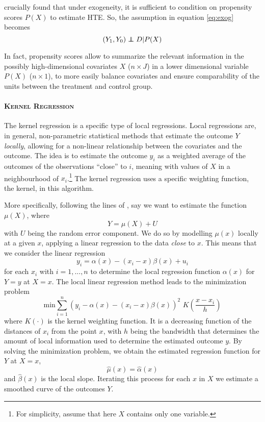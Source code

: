 \documentclass[12pt,a4paper,openright,twoside]{book}
\newcommand\independent{\protect\mathpalette{\protect\independenT}{\perp}}
\def\independenT#1#2{\mathrel{\rlap{$#1#2$}\mkern2mu{#1#2}}}
\newcounter{intropara}
\begin{document}
\begin{doublespacing}
\citet{rosenbaum1983central} crucially found that under exogeneity, it is sufficient to condition on propensity scores $P(X)$ to estimate HTE. So, the assumption in equation \ref{eq:exog} becomes 
\begin{equation}
    (Y_1, Y_0) \independent D | P(X)
\end{equation}

In fact, propensity scores allow to summarize the relevant information in the possibly high-dimensional covariates $X$ ($n \times J$) in a lower dimensional variable $P(X)$ ($n \times 1$), to more easily balance covariates and ensure comparability of the units between the treatment and control group. 

\label{kernel}
\paragraph{\scshape Kernel Regression} 
The kernel regression is a specific type of local regressions. Local regressions are, in general, non-parametric statistical methods that estimate the outcome $Y$ \textit{locally}, allowing for a non-linear relationship between the covariates and the outcome. The idea is to estimate the outcome $y_i$ as a weighted average of the outcomes of the observations ``close'' to $i$, meaning with values of $X$ in a neighbourhood of $x_i$.\footnote{For simplicity, assume that here $X$ contains only one variable.} The kernel regression uses a specific weighting function, the kernel, in this algorithm. 

More specifically, following the lines of \citet{Ullah2016}, say we want to estimate the function $\mu(X)$, where
\begin{equation}
Y = \mu(X) + U
\end{equation}
with $U$ being the random error component. We do so by modelling $\mu(x)$ locally at a given $x$, applying a linear regression to the data \textit{close} to $x$. This means that we consider the linear regression
\begin{equation}
y_i = \alpha (x) - (x_i - x)\beta(x) + u_i
\end{equation}
for each $x_i$ with $i=1,...,n$ to determine the local regression function $\alpha(x)$ for $Y=y$ at $X=x$. The local linear regression method leads to the minimization problem 
\begin{equation}
    \text{min} \sum_{i=1}^{n}{(y_i - \alpha (x) - (x_i - x)\beta(x))^2 \,\, K\left(\frac{x - x_i}{h}\right) }
\end{equation}
where $K(\cdot)$ is the kernel weighting function. It is a decreasing function of the distances of $x_i$ from the point $x$, with $h$ being the bandwidth that determines the amount of local information used to determine the estimated outcome $y$. By solving the minimization problem, we obtain the estimated regression function for $Y$ at $X=x$, 
\begin{equation}
    \hat{\mu}(x) = \hat{\alpha}(x)
\end{equation}
and $\hat{\beta}(x)$ is the local slope. Iterating this process for each $x$ in $X$ we estimate a smoothed curve of the outcomes $Y$.


\end{doublespacing}
\end{document}
